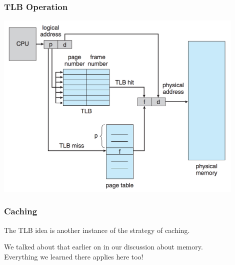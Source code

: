 \begin{frame}
\frametitle{TLB Operation}

\begin{center}
\includegraphics[width=0.9\textwidth]{images/tlb-hardware.png}
\end{center}


\end{frame}

\begin{frame}
\frametitle{Caching}

The TLB idea is another instance of the strategy of caching. 

We talked about that earlier on in our discussion about memory.\\
\quad Everything we learned there applies here too!

\end{frame}



